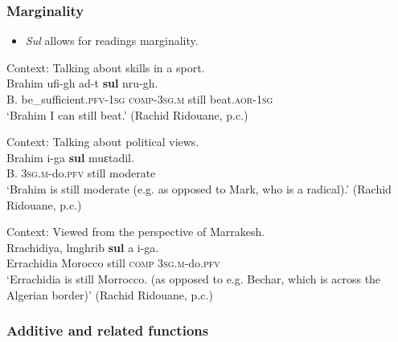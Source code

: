 \subsubsection{Marginality}
\label{appendixTashelhyitMarginal}
\begin{itemize}
	\item \textit{Sul} allows for readings marginality.
\end{itemize}
\begin{exe}
	\label{exAppendixTahselhyitMarginal1}
	\ex Context: Talking about skills in a sport.\\
	\gll Brahim ufi-gh ad-t \textbf{sul} nru-gh.\\
B. be\_sufficient.\textsc{pfv}-1\textsc{sg} \textsc{comp}-3\textsc{sg}.\textsc{m} still beat.\textsc{aor}-1\textsc{sg}\\
	\glt \lq Brahim I can still beat.' (Rachid Ridouane, p.c.)

	\ex Context: Talking about political views.\\
	\label{exAppendixTahselhyitMarginal2}
	\gll Brahim i-ga \textbf{sul} muɛtadil.\\
	B. 3\textsc{sg}.\textsc{m}-do.\textsc{pfv} still moderate\\
	\glt \lq Brahim is still moderate (e.g. as opposed to Mark, who is a radical).' (Rachid Ridouane, p.c.)
	
	\ex Context: Viewed from the perspective of Marrakesh.\\
	\label{exAppendixTahselhyitMarginal3}
	\gll Rrachidiya, lmghrib \textbf{sul} a i-ga.\\
	Errachidia Morocco still \textsc{comp} 3\textsc{sg}.\textsc{m}-do.\textsc{pfv}\\
	\glt \lq Errachidia is still Morrocco. (as opposed to e.g. Bechar, which is across the Algerian border)' (Rachid Ridouane, p.c.)
\end{exe}

\subsubsection{Additive and related functions}
